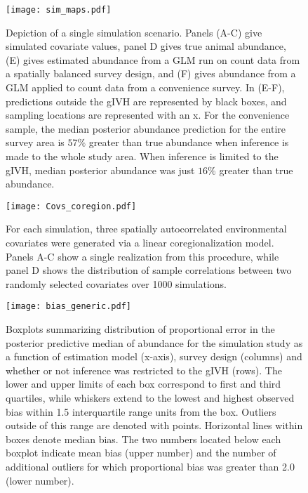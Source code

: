 \documentclass[12pt,fleqn]{article}
\begin{document}
\begin{figure}[!h]
\begin{center}
\texttt{[image: sim\_maps.pdf]}
\end{center}
\caption{Depiction of a single simulation scenario.  Panels (A-C) give simulated covariate values, panel D gives true animal abundance, (E) gives estimated abundance from a GLM run on count data from a spatially balanced survey design, and (F) gives abundance from a GLM applied to count data from a convenience survey.  In (E-F), predictions outside the gIVH are represented by black boxes, and sampling locations are represented with an x.  For the convenience sample, the median posterior abundance prediction for the entire survey area is $57\%$ greater than true abundance when inference is made to the whole study area.  When inference is limited to the gIVH, median posterior abundance was just $16\%$ greater than true abundance.}
\label{fig:sim_maps}
\end{figure}

\begin{figure}[!h]
\begin{center}
\texttt{[image: Covs\_coregion.pdf]}
\end{center}
\caption{For each simulation, three spatially autocorrelated environmental covariates were generated via a linear coregionalization model.  Panels A-C show a single realization from this procedure, while panel D shows the distribution of sample correlations between two randomly selected covariates over 1000 simulations.}
\label{fig:covs}
\end{figure}



\begin{figure}[!h]
\begin{center}
\texttt{[image: bias\_generic.pdf]}
\end{center}
\caption{Boxplots summarizing distribution of proportional error in the posterior predictive median of abundance for the simulation study as a function of estimation model (x-axis), survey design (columns) and whether or not inference was restricted to the gIVH (rows).  The lower and upper limits of each box correspond to first and third quartiles, while whiskers extend to the lowest and highest observed bias within 1.5 interquartile range units from the box.  Outliers outside of this range are denoted with points.  Horizontal lines within boxes denote median bias.  The two numbers located below each boxplot indicate mean bias (upper number) and the number of additional outliers for which proportional bias was greater than 2.0 (lower number). }
\label{fig:sim_boxplots}
\end{figure}  
\end{document}
